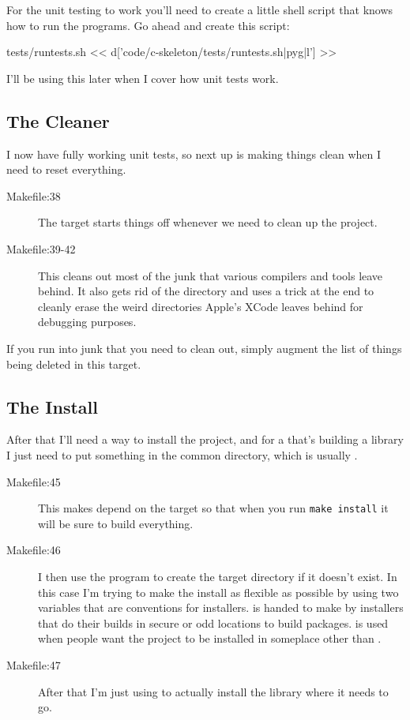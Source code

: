 For the unit testing to work you'll need to create a little shell script
that knows how to run the programs.  Go ahead and create this  script:


\begin{code}{tests/runtests.sh}
<< d['code/c-skeleton/tests/runtests.sh|pyg|l'] >>
\end{code}

I'll be using this later when I cover how unit tests work.

\subsection{The Cleaner}

I now have fully working unit tests, so next up is making things clean when
I need to reset everything.

\begin{description}
\item[Makefile:38] The  target starts things off whenever we
    need to clean up the project.
\item[Makefile:39-42] This cleans out most of the junk that various compilers
    and tools leave behind.  It also gets rid of the  directory
    and uses a trick at the end to cleanly erase the weird 
    directories Apple's XCode leaves behind for debugging purposes.
\end{description}

If you run into junk that you need to clean out, simply augment the list of things
being deleted in this target.

\subsection{The Install}

After that I'll need a way to install the project, and for a  that's
building a library I just need to put something in the common 
directory, which is usually .

\begin{description}
\item[Makefile:45] This makes  depend on the  target
    so that when you run \verb|make install| it will be sure to build everything.
\item[Makefile:46] I then use the program  to create the target
     directory if it doesn't exist.  In this case I'm trying to make
    the install as flexible as possible by using two variables that are conventions
    for installers.   is handed to make by installers that 
    do their builds in secure or odd locations to build packages.  
    is used when people want the project to be installed in someplace other
    than .
\item[Makefile:47] After that I'm just using  to actually install
    the library where it needs to go.
\end{description}

